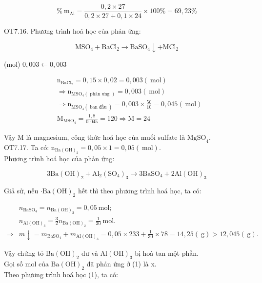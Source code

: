 \documentclass[10pt]{article}
\begin{document}
$$
\% \mathrm{~m}_{\mathrm{Al}}=\frac{0,2 \times 27}{0,2 \times 27+0,1 \times 24} \times 100 \%=69,23 \%
$$

OT7.16. Phương trình hoá học của phản ứng:

$$
\mathrm{MSO}_{4}+\mathrm{BaCl}_{2} \rightarrow \mathrm{BaSO}_{4} \downarrow+\mathrm{MCl}_{2}
$$

(mol) $0,003 \leftarrow 0,003$

$$
\begin{aligned}
& \mathrm{n}_{\mathrm{BaCl}_{2}}=0,15 \times 0,02=0,003(\mathrm{~mol}) \\
& \Rightarrow \mathrm{n}_{\mathrm{MSO}_{4}(\text { phàn ưng })}=0,003(\mathrm{~mol}) \\
& \Rightarrow \mathrm{n}_{\mathrm{MSO}_{4}(\text { ban đầu })}=0,003 \times \frac{50}{10}=0,045(\mathrm{~mol}) \\
& \mathrm{M}_{\mathrm{MSO}_{4}}=\frac{1,8}{0,045}=120 \Rightarrow \mathrm{M}=24
\end{aligned}
$$

Vậy M là magnesium, công thức hoá học của muối sulfate là $\mathrm{MgSO}_{4}$.\\
OT7.17. Ta có: $\mathrm{n}_{\mathrm{Ba}(\mathrm{OH})_{2}}=0,05 \times 1=0,05(\mathrm{~mol})$.\\
Phương trình hoá học của phản ứng:


\begin{equation*}
3 \mathrm{Ba}(\mathrm{OH})_{2}+\mathrm{Al}_{2}\left(\mathrm{SO}_{4}\right)_{3} \rightarrow 3 \mathrm{BaSO}_{4}+2 \mathrm{Al}(\mathrm{OH})_{3} \tag{1}
\end{equation*}


Giả sử, nếu $\cdot \mathrm{Ba}(\mathrm{OH})_{2}$ hết thì theo phương trình hoá học, ta có:

$$
\begin{aligned}
& n_{\mathrm{BaSO}_{4}}=n_{\mathrm{Ba}(\mathrm{OH})_{2}}=0,05 \mathrm{~mol} ; \\
& n_{\mathrm{Al}(\mathrm{OH})_{3}}=\frac{3}{2} n_{\mathrm{Ba}(\mathrm{OH})_{2}}=\frac{1}{30} \mathrm{~mol} . \\
\Rightarrow & m \downarrow=m_{\mathrm{BaSO}_{4}}+m_{\mathrm{Al}(\mathrm{OH})_{3}}=0,05 \times 233+\frac{1}{30} \times 78=14,25(\mathrm{~g})>12,045(\mathrm{~g}) .
\end{aligned}
$$

Vậy chứng tỏ $\mathrm{Ba}(\mathrm{OH})_{2}$ dư và $\mathrm{Al}(\mathrm{OH})_{3}$ bị hoà tan một phần.\\
Gọi số mol của $\mathrm{Ba}(\mathrm{OH})_{2}$ đã phản ứng ở (1) là x.\\
Theo phương trình hoá học (1), ta có:
\end{document}
